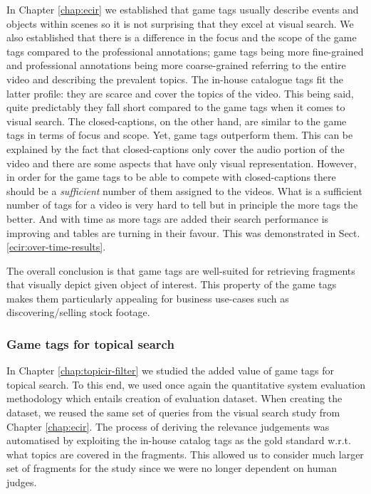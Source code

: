 In Chapter \ref{chap:ecir} we established that game tags usually describe events and objects within scenes so it is not surprising that they excel at visual search. We also established that there is a difference in the focus and the scope of the game tags compared to the professional annotations; game tags being more fine-grained and professional annotations being more coarse-grained referring to the entire video and describing the prevalent topics. The in-house catalogue tags fit the latter profile: they are scarce and cover the topics of the video. This being said, quite predictably they fall short compared to the game tags when it comes to visual search. The closed-captions, on the other hand, are similar to the game tags in terms of focus and scope. Yet, game tags outperform them. This can be explained by the fact that closed-captions only cover the audio portion of the video and there are some aspects that have only visual representation. However, in order for the game tags to be able to compete with closed-captions there should be a \textit{sufficient} number of them assigned to the videos. What is a sufficient number of tags for a video is very hard to tell but in principle the more tags the better. And with time as more tags are added their search performance is improving and tables are turning in their favour. This was demonstrated in Sect. \ref{ecir:over-time-results}.

The overall conclusion is that game tags are well-suited for retrieving fragments that visually depict given object of interest. This property of the game tags makes them particularly appealing for business use-cases such as discovering/selling stock footage. 

\subsubsection{Game tags for topical search}
In Chapter \ref{chap:topicir-filter} we studied the added value of game tags for topical search. To this end, we used once again the quantitative system evaluation methodology which entails creation of evaluation dataset. When creating the dataset, we reused the same set of queries from the visual search study from Chapter \ref{chap:ecir}. The process of deriving the relevance judgements was automatised by exploiting the in-house catalog tags as the gold standard w.r.t. what topics are covered in the fragments. This allowed us to consider much larger set of fragments for the study since we were no longer dependent on human judges. 

